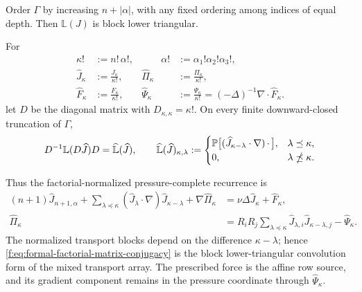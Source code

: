 \begin{proposition}
Order \(\Gamma\) by increasing \(n+|\alpha|\), with any fixed ordering among
indices of equal depth.  Then \(\mathbb L(J)\) is block lower triangular.
\begin{samepage}
For
\[
 \begin{aligned}
 \kappa!&:=n!\,\alpha!,
 &\qquad \alpha!&:=\alpha_1!\alpha_2!\alpha_3!,\\
 \widehat J_\kappa&:=\frac{J_\kappa}{\kappa!},
 &\widehat\Pi_\kappa&:=\frac{\Pi_\kappa}{\kappa!},\\
 \widehat F_\kappa&:=\frac{F_\kappa}{\kappa!},
 &\widehat\Psi_\kappa&:=\frac{\Psi_\kappa}{\kappa!}
 =(-\Delta)^{-1}\nabla\cdot\widehat F_\kappa.
 \end{aligned}
\]
let \(D\) be the diagonal matrix with \(D_{\kappa,\kappa}=\kappa!\).  On
every finite downward-closed truncation of \(\Gamma\),
\begin{equation}
 D^{-1}\mathbb L(D\widehat J)D
 =\widehat{\mathbb L}(\widehat J),
 \qquad
 \widehat{\mathbb L}(\widehat J)_{\kappa,\lambda}
 :=
 \begin{cases}
 \mathbb P\bigl[(\widehat J_{\kappa-\lambda}\cdot\nabla)
            \,\mathord\cdot\,\bigr],
 &\lambda\preceq\kappa,\\
 0,&\lambda\npreceq\kappa.
 \end{cases}
 \label{f:eq:formal-factorial-matrix-conjugacy}
\end{equation}
\end{samepage}
Thus the factorial-normalized pressure-complete recurrence is
\begin{align}
 (n+1)\widehat J_{n+1,\alpha}
 +\sum_{\lambda\preceq\kappa}
   (\widehat J_\lambda\cdot\nabla)
   \widehat J_{\kappa-\lambda}
 +\nabla\widehat\Pi_\kappa
 &=\nu\Delta\widehat J_\kappa+\widehat F_\kappa,
 \label{f:eq:formal-factorial-velocity-convolution}\\
 \widehat\Pi_\kappa
 &=R_iR_j\sum_{\lambda\preceq\kappa}
   \widehat J_{\lambda,i}\widehat J_{\kappa-\lambda,j}
   -\widehat\Psi_\kappa.
 \label{f:eq:formal-factorial-pressure-convolution}
\end{align}
The normalized transport blocks depend on the difference
\(\kappa-\lambda\); hence \eqref{f:eq:formal-factorial-matrix-conjugacy} is the
block lower-triangular convolution form of the mixed transport array.  The
prescribed force is the affine row source, and its gradient component remains
in the pressure coordinate through \(\widehat\Psi_\kappa\).
\end{proposition}

